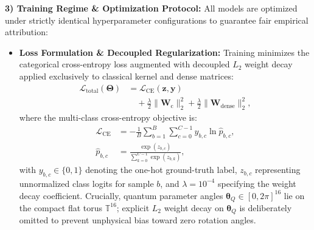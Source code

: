\documentclass[pdflatex,sn-mathphys-num]{sn-jnl}%
\theoremstyle{thmstyleone}%
\theoremstyle{thmstyletwo}%
\theoremstyle{thmstylethree}%
\begin{document}
\textbf{3) Training Regime \& Optimization Protocol:}
All models are optimized under strictly identical hyperparameter configurations to guarantee fair empirical attribution:
\begin{itemize}
    \item \textbf{Loss Formulation \& Decoupled Regularization:} Training minimizes the categorical cross-entropy loss augmented with decoupled $L_2$ weight decay applied exclusively to classical kernel and dense matrices:
    \begin{align}
    \mathcal{L}_{\mathrm{total}}(\boldsymbol{\Theta}) &= \mathcal{L}_{\mathrm{CE}}(\mathbf{z}, \mathbf{y}) \nonumber \\
    &\quad + \frac{\lambda}{2} \|\mathbf{W}_{\mathrm{c}}\|_2^2 + \frac{\lambda}{2} \|\mathbf{W}_{\mathrm{dense}}\|_2^2,
    \label{eq:total_regularized_loss}
    \end{align}
    where the multi-class cross-entropy objective is:
    \begin{align}
    \mathcal{L}_{\mathrm{CE}} &= -\frac{1}{B} \sum_{b=1}^{B} \sum_{c=0}^{C-1} y_{b,c} \ln \hat{p}_{b,c}, \nonumber \\
    \hat{p}_{b,c} &= \frac{\exp(z_{b,c})}{\sum_{k=0}^{C-1} \exp(z_{b,k})},
    \label{eq:cross_entropy_exp2}
    \end{align}
    with $y_{b,c} \in \{0, 1\}$ denoting the one-hot ground-truth label, $z_{b,c}$ representing unnormalized class logits for sample $b$, and $\lambda = 10^{-4}$ specifying the weight decay coefficient. Crucially, quantum parameter angles $\boldsymbol{\theta}_Q \in [0, 2\pi]^{16}$ lie on the compact flat torus $\mathbb{T}^{16}$; explicit $L_2$ weight decay on $\boldsymbol{\theta}_Q$ is deliberately omitted to prevent unphysical bias toward zero rotation angles.


\end{itemize}
\end{document}

